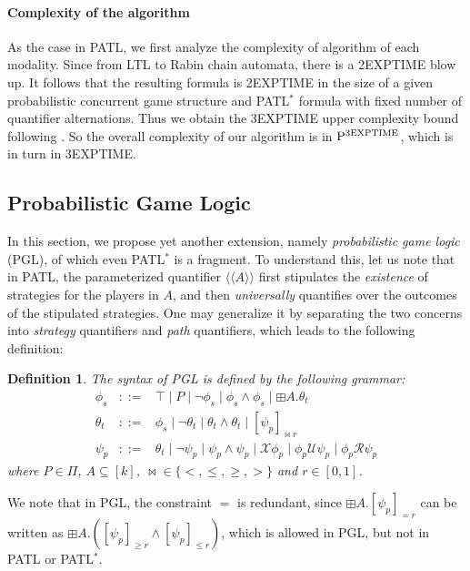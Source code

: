 \documentclass[times, 10 pt,twocolumn]{article}
\newtheorem{definition}[theorem]{Definition}{\bfseries}{\rm}
\newcommand{\mc}[1]{\mathcal{#1}}
\newcommand{\lla}{\langle\langle}
\newcommand{\rra}{\rangle\rangle}
\begin{document}
\paragraph{Complexity of the algorithm} As the case in PATL, we first analyze
the complexity of algorithm of each modality. Since from LTL to
Rabin chain automata, there is a 2E{\small XPTIME} blow up. It
follows that the resulting formula is 2E{\small XPTIME} in the
size of a given probabilistic concurrent game structure and
PATL$^*$ formula with fixed number of quantifier alternations.
Thus we obtain the 3E{\small XPTIME} upper complexity bound
following \cite{Tar51}\cite{Bas99}. So the overall complexity of
our algorithm is in ${\rm P}^{\rm 3EXPTIME}$, which is in turn in
3E{\small XPTIME}.

\subsection{Probabilistic Game Logic}
In this section, we %
propose yet another extension, namely \emph{probabilistic game
logic} (PGL), of which even PATL$^*$ is a fragment. To understand
this, let us note that in PATL, the parameterized quantifier $\lla
A\rra$ first stipulates the \emph{existence} of strategies for the
players in $A$, and then \emph{universally} quantifies over the
outcomes of the stipulated strategies. One may generalize it by
separating the two concerns into \emph{strategy} quantifiers and
\emph{path} quantifiers, which leads to the following definition:

\begin{definition} The syntax of \emph{PGL} is defined by the
following grammar:
\begin{eqnarray*}
  \phi_s    & ::= & \top\mid P \mid \neg \phi_s \mid  \phi_s \wedge \phi_s \mid \boxplus A. \theta_t\\
  \theta_t  & ::= & \phi_s \mid \neg\theta_t \mid \theta_t \wedge \theta_t \mid [\psi_p]_{\bowtie r}\\
  \psi_p    & ::= & \theta_t\mid \neg\psi_p \mid \psi_p\wedge \psi_p \mid \mc{X}\phi_p\mid \phi_p\mc{U}\psi_p \mid
  \phi_p\mc{R}\psi_p
\end{eqnarray*}
where $P\in \Pi$, $A\subseteq [k]$, $\bowtie \in\{<, \leq, \geq,
>\}$ and $r\in [0,1]$.
%
\end{definition}

We note that in PGL, the constraint $=$ is redundant, since
$\boxplus A. [\psi_p]_{= r}$ can be written as $\boxplus A.
([\psi_p]_{\geq r}\wedge [\psi_p]_{\leq r})$, which is allowed in
PGL, but not in PATL or PATL$^*$.
\end{document}
